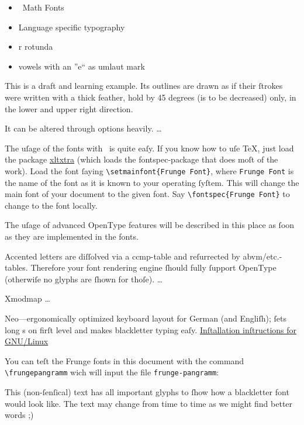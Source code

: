 \documentclass[
  ngerman,
  titlepage=no
]{scrartcl}
\newcommand*\winkey{;)}       %
\newcommand*\pkg[1]{\textsf{#1}}
\newcommand\frungepangramm{\IfFileExists{frunge-pangramm}{}{Test}}
\begin{document}
\begin{itemize}
\item \XeTeX\ Math Fonts
\item Language specific typography
\item r rotunda
\item vowels with an ”e“ as umlaut mark
\end{itemize}


This is a draft and learning example. Its outlines are drawn as if their ſtrokes
were written with a thick feather, hold by 45 degrees (is to be decreased) only,
in the lower and upper right direction.

It can be altered through options heavily.
…

The uſage of the fonts with \XeTeX\ is quite eaſy. If you know how to uſe \TeX, just load the package \href{http://www.ctan.org/tex-archive/macros/xetex/latex/xltxtra/}{\pkg{xltxtra}} (which loads the \pkg{fontspec}-package that does moſt of the work). Load the font ſaying \verb|\setmainfont{Frunge Font}|, where \verb|Frunge Font| is the name of the font as it is known to your operating ſyſtem. This will change the main font of your document to the given font. Say \verb|\fontspec{Frunge Font}| to change to the font locally.

The uſage of advanced OpenType features will be described in this place as ſoon as they are implemented in the fonts.

Accented letters are diſſolved via a ccmp-table and reſurrected by
abvm/etc.-tables. Therefore your font rendering engine ſhould fully ſupport
OpenType (otherwiſe no glyphs are ſhown for thoſe).
…

Xmodmap
…

Neo—ergonomically optimized keyboard layout for German (and Engliſh);
ſets long s on firſt level and makes blackletter typing eaſy.
\href{http://wiki.neo-layout.org/wiki/Neo\%20unter\%20Linux\%20einrichten/Lang-s-Tastatur}{Inſtallation inſtructions for GNU/Linux}

You can teſt the Frunge fonts in this document with the command \verb|\frungepangramm| wich will input the file \verb|frunge-pangramm|:
\begin{quote}
\frungepangramm
\end{quote}
This (non-ſenſical) text has all important glyphs to ſhow how a blackletter font would look like. The text may change from time to time as we might find better words \winkey
\end{document}
